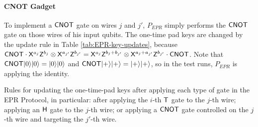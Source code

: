 \documentclass[11pt]{article}
\theoremstyle{remark}
\theoremstyle{definition}
\newcommand{\ket}[1]{|#1\rangle}
\begin{document}
\paragraph{CNOT Gadget} To implement a $\sf CNOT$ gate on wires $j$ and $j'$, $P_{EPR}$ simply performs the $\sf CNOT$ gate on those wires of his input qubits. The one-time pad keys are changed by the update rule in Table \ref{tab:EPR-key-updates}, because ${\sf CNOT}\cdot {\sf X}^{a_j}{\sf Z}^{b_j}\otimes {\sf X}^{a_{j'}}{\sf Z}^{b_{j'}}={\sf X}^{a_j}{\sf Z}^{b_j+b_{j'}}\otimes {\sf X}^{a_j+a_{j'}}{\sf Z}^{b_{j'}}\cdot {\sf CNOT}$. Note that ${\sf CNOT}\ket{0}\ket{0}=\ket{0}\ket{0}$ and ${\sf CNOT}\ket{+}\ket{+}=\ket{+}\ket{+}$, so in the test runs, $P_{EPR}$ is applying the identity. 

\begin{table}[t]


\caption{Rules for updating the one-time-pad keys after applying each type of gate in the EPR Protocol, in particular: after applying the $i$-th $\sf T$ gate to the $j$-th wire; applying an $\sf H$ gate to the $j$-th wire; or applying a $\sf CNOT$ gate controlled on the $j$-th wire and targeting the $j'$-th wire. 
}\label{tab:EPR-key-updates}
\end{table}
\end{document}

